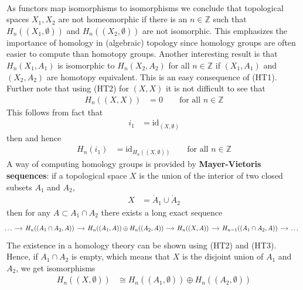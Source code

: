 \\
As functors map isomorphisms to isomorphisms we conclude that topological spaces $X_{1},X_{2}$ are not homeomorphic if there is an $n \in \mathbb{Z}$ such that $H_{n}((X_{1},\emptyset))$ and $H_{n}((X_{2},\emptyset))$ are not isomorphic. This emphasizes the importance of homology in (algebraic) topology since homology groups are often easier to compute than homotopy groups.  Another interesting result is that $H_{n}(X_{1},A_{1})$ is isomorphic to $H_{n}(X_{2},A_{2})$ for all $n \in \mathbb{Z}$ if $(X_{1},A_{1})$ and $(X_{2},A_{2})$ are homotopy equivalent. This is an easy consequence of (HT1). Further note that using (HT2) for $(X,X)$ it is not difficult to see that
\begin{align*}
  H_{n}((X,X))
  &=
  0
  \qquad
  \text{for all }
  n
  \in
  \mathbb{Z}
\end{align*}
This follows from fact that
\begin{align*}
  i_{1}
  &=
  \mathrm{id}_{(X,\emptyset)}
\end{align*}
then and hence
\begin{align*}
  H_{n}(i_{1})
  &=
  \mathrm{id}_{H_{n}((X,\emptyset))}
  \qquad
  \text{for all }
  n
  \in
  \mathbb{Z}
\end{align*}
A way of computing homology groups is provided by \textbf{Mayer-Vietoris sequences}: if a topological space $X$ is the union of the interior of two closed subsets $A_{1}$ and $A_{2}$,
\begin{align*}
  X
  &=
  \mathring{A}_{1}
  \cup
  \mathring{A}_{2}
\end{align*}
then for any $A \subset A_{1} \cap A_{2}$ there exists a long exact sequence
\begin{equation*}
\hspace{-0.8em}
\begin{tikzcd}[row sep=2.2em,column sep=1.2em]
  \ldots
  \ar{r}
  &
  H_{n}((A_{1} \cap A_{2},A))
  \ar{r}
  &
  H_{n}((A_{1},A))
  \oplus
  H_{n}((A_{2},A))
  \ar{r}
  &
  H_{n}((X,A))
  \ar{r}
  &
  H_{n-1}((A_{1} \cap A_{2},A))
  \ar{r}
  &
  \ldots
\end{tikzcd}
\end{equation*}
The existence in a homology theory can be shown using (HT2) and (HT3). Hence, if $A_{1} \cap A_{2}$ is empty, which means that $X$ is the disjoint union of $A_{1}$ and $A_{2}$, we get isomorphisms
\begin{align*}
  H_{n}((X,\emptyset))
  &\cong
  H_{n}((A_{1},\emptyset))
  \oplus
  H_{n}((A_{2},\emptyset))
\end{align*}
